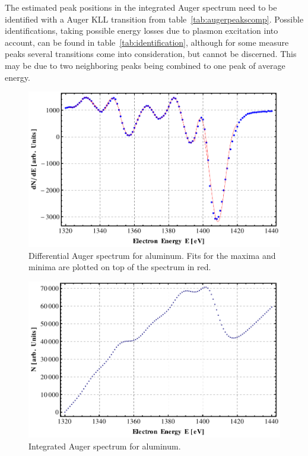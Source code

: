 \documentclass[a4paper,10pt]{scrartcl}
\begin{document}
The estimated peak positions in the integrated Auger spectrum need to be identified with a Auger KLL transition from table~\ref{tab:augerpeakscomp}. Possible identifications, taking possible energy losses due to plasmon excitation into account, can be found in table~\ref{tab:identification}, although for some measure peaks several transitions come into consideration, but cannot be discerned. This may be due to two neighboring peaks being combined to one peak of average energy.

\begin{figure}
\centering
\includegraphics[scale=0.6]{img/augerpeaks}
\caption{Differential Auger spectrum for aluminum. Fits for the maxima and minima are plotted on top of the spectrum in red. \label{fig:augerpeaks}}
\end{figure}

\begin{figure}
\centering
\includegraphics[scale=0.6]{img/intaugerpeaks}
\caption{Integrated Auger spectrum for aluminum. \label{fig:intaugerpeaks}}
\end{figure}
\end{document}
